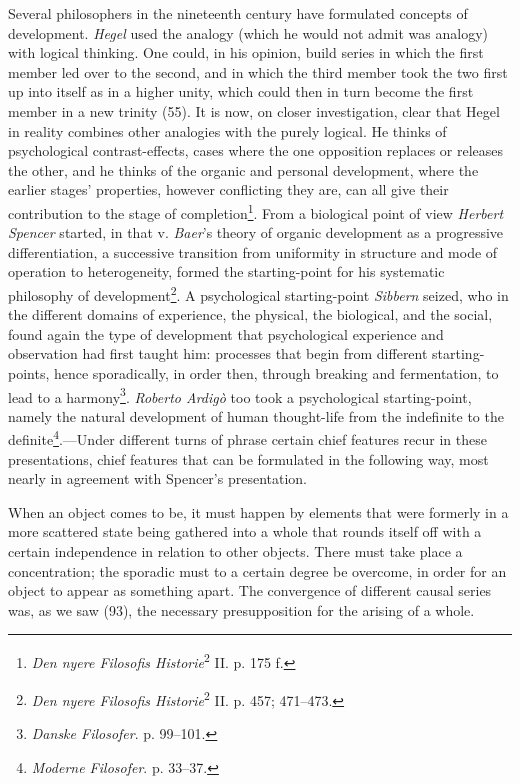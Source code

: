 \documentclass[12pt,a4paper]{book}
\newcommand{\opage}[1]{\marginnote{\footnotesize\textit{[#1]}}}
\begin{document}
Several philosophers in the nineteenth century have formulated concepts of
development. \emph{Hegel} used the analogy (which he would not admit was
analogy) with logical thinking. One could, in his opinion, build series in
which the first member led over to the second, and in which the third member
took the two first up into itself as in a higher unity, which could then in
turn become the first member in a new trinity (55). It is now, on closer
investigation, clear that Hegel in reality combines other analogies with the
purely logical. He thinks of psychological contrast-effects, cases where the
one opposition replaces or releases the other, and he thinks of the organic
and personal development, where the earlier stages' properties, however
conflicting they are, can all give their contribution to the stage of
completion\footnote{\emph{Den nyere Filosofis Historie}\textsuperscript{2}
II. p. 175 f.}. From a biological point of view \emph{Herbert Spencer}
started, in that v. \emph{Baer}'s theory of organic development as a
progressive differentiation, a successive transition from uniformity in
structure and mode of operation to heterogeneity, formed the starting-point
for his systematic philosophy of development\footnote{\emph{Den nyere
Filosofis Historie}\textsuperscript{2} II. p. 457; 471--473.}. A psychological
starting-point \emph{Sibbern} seized, who in the different domains of
experience, the physical, the biological, and the social, found again the
type of development that psychological experience and observation had first
taught him: processes that begin from different starting-points, hence
sporadically, in order then, through breaking and fermentation, to lead to a
harmony\footnote{\emph{Danske Filosofer}. p. 99--101.}. \emph{Roberto
Ardigò} too took a psychological starting-point, namely the \opage{233}natural
development of human thought-life from the indefinite to the
definite\footnote{\emph{Moderne Filosofer}. p. 33--37.}.---Under different
turns of phrase certain chief features recur in these presentations, chief
features that can be formulated in the following way, most nearly in
agreement with Spencer's presentation.

When an object comes to be, it must happen by elements that were formerly in
a more scattered state being gathered into a whole that rounds itself off with
a certain independence in relation to other objects. There must take place a
concentration; the sporadic must to a certain degree be overcome, in order
for an object to appear as something apart. The convergence of different
causal series was, as we saw (93), the necessary presupposition for the
arising of a whole.
\end{document}
